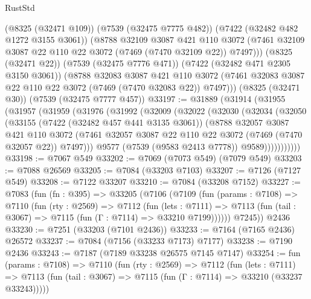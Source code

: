 \begin{lexlean}{RustStd}
\begin{coremodule}
        (@8325 (@32471 @109))
        (@7539 (@32475 @7775 @482))
        (@7422 (@32482 @482 @1272 @3155 @3061))
        (@8788
          @32109
          @3087
          @421
          @110
          @3072
          (@7461 @32109 @3087 @22 @110 @22 @3072 (@7469 (@7470 @32109 @22)) @7497)))
      (@8325 (@32471 @22))
      (@7539 (@32475 @7776 @471))
      (@7422 (@32482 @471 @2305 @3150 @3061))
      (@8788
        @32083
        @3087
        @421
        @110
        @3072
        (@7461 @32083 @3087 @22 @110 @22 @3072 (@7469 (@7470 @32083 @22)) @7497)))
    (@8325 (@32471 @30))
    (@7539 (@32475 @7777 @457))
@33197 := @31889
    (@31914
      (@31955
        (@31957
          (@31959
            (@31976
              (@31992
                (@32009
                  (@32022
                    (@32030
                      (@32034
                        (@32050
                          (@33155
                            (@7422 (@32482 @457 @441 @3135 @3061))
                            (@8788
                              @32057
                              @3087
                              @421
                              @110
                              @3072
                              (@7461
                                @32057
                                @3087
                                @22
                                @110
                                @22
                                @3072
                                (@7469 (@7470 @32057 @22))
                                @7497)))
                          @9577
                          (@7539 (@9583 @2413 @7778))
                          @9589)))))))))))
@33198 := @7067 @549
@33202 := @7069 (@7073 @549) (@7079 @549)
@33203 := @7088 @26569
@33205 := @7084 (@33203 @7103)
@33207 := @7126 (@7127 @549)
@33208 := @7122 @33207
@33210 := @7084 (@33208 @7152)
@33227 := @7083
    (fun (fn : @395) =>
    @33205
      (@7106
        (@7109
          (fun (params : @7108) =>
          @7110
            (fun (rty : @2569) =>
            @7112
              (fun (lets : @7111) =>
              @7113 (fun (tail : @3067) => @7115 (fun (Γ : @7114) => @33210 @7199))))))
        @7245))
    @2436
@33230 := @7251 (@33203 (@7101 @2436))
@33233 := @7164 (@7165 @2436) @26572
@33237 := @7084 (@7156 (@33233 @7173) @7177)
@33238 := @7190 @2436
@33243 := @7187 (@7189 @33238 @26575 @7145 @7147)
@33254 := fun (params : @7108) =>
  @7110
    (fun (rty : @2569) =>
    @7112
      (fun (lets : @7111) =>
      @7113 (fun (tail : @3067) => @7115 (fun (Γ : @7114) => @33210 (@33237 @33243)))))

\end{coremodule}
\end{lexlean}
